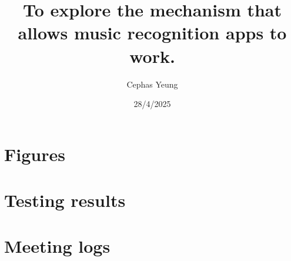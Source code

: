 \documentclass[twoside]{report}
\title{To explore the mechanism that allows music recognition apps to work. }
\author{Cephas Yeung}
\date{28/4/2025}
\begin{document}
\maketitle
\tableofcontents
\newpage



\appendix



\chapter{Figures}

\chapter{Testing results}

\chapter{Meeting logs}


\end{document}

